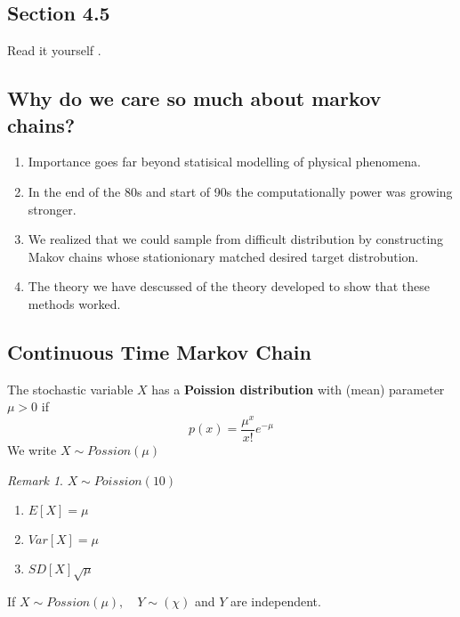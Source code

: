 \documentclass{article}
\theoremstyle{remark}
\newtheorem*{remark}{Remark}
\begin{document}
\subsection{Section 4.5}%
\label{sub:section_4_5}
Read it yourself .


\subsection{Why do we care so much about markov chains?}%
\label{sub:why_do_we_care_so_much_about_markov_chains_}

\begin{enumerate}[label=(\roman*)]
  \item Importance goes far beyond statisical modelling of physical phenomena.
  \item In the end of the 80s and start of 90s the computationally power was growing stronger.
  \item We realized that we could sample from difficult distribution  by constructing Makov chains whose stationionary matched desired target distrobution.
  \item The theory we have descussed of the theory developed to show that these methods worked.
\end{enumerate}

\subsection{Continuous Time Markov Chain}%
\label{sub:continuous_time_markov_chain}


\begin{definition}
  The stochastic variable $X$  has a \textbf{Poission distribution}  with (mean) parameter $\mu > 0$ if \[
  p\left( x \right) = \frac{\mu ^{x}}{x!}  e^{- \mu }
  \]
  We write $X \sim Possion (\mu )$
\end{definition}

\begin{remark}
  $X \sim Poission (10)$
   \begin{enumerate}[label=(\roman*)]
    \item $E\left[ X \right] = \mu $
    \item $Var\left[ X \right] = \mu $
    \item $SD\left[ X \right] \sqrt{\mu } $
  \end{enumerate}
\end{remark}

\begin{theorem}
  If $X \sim Possion (\mu ), \quad  Y \sim \left( \chi  \right) $ and $Y $ are independent.
\end{theorem}
\end{document}
